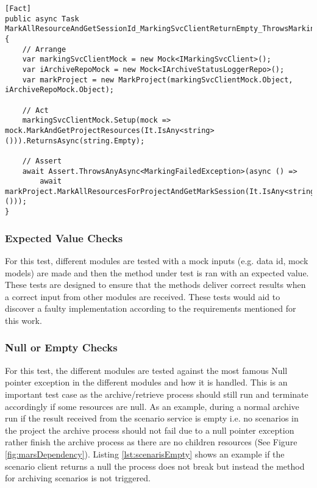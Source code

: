 \newpage
\begin{lstlisting}[language={[Sharp]C}, caption={Exception catch test example}, captionpos=b,label={lst:exceptionCatch}]
[Fact]
public async Task MarkAllResourceAndGetSessionId_MarkingSvcClientReturnEmpty_ThrowsMarkingFailedException()
{
    // Arrange
    var markingSvcClientMock = new Mock<IMarkingSvcClient>();
    var iArchiveRepoMock = new Mock<IArchiveStatusLoggerRepo>();
    var markProject = new MarkProject(markingSvcClientMock.Object, iArchiveRepoMock.Object);
    
    // Act 
    markingSvcClientMock.Setup(mock => mock.MarkAndGetProjectResources(It.IsAny<string>())).ReturnsAsync(string.Empty);
    
    // Assert
    await Assert.ThrowsAnyAsync<MarkingFailedException>(async () =>
        await markProject.MarkAllResourcesForProjectAndGetMarkSession(It.IsAny<string>()));
}
\end{lstlisting}

\subsubsection{Expected Value Checks}
For this test, different modules are tested with a mock inputs (e.g. data id, mock models) are made and then the method under test is ran with an 
expected value. These tests are designed to ensure that the methods deliver correct results when a correct input from other modules are received.
These tests would aid to discover a faulty implementation according to the requirements mentioned for this work.

\subsubsection{Null or Empty Checks}
For this test, the different modules are tested against the most famous Null pointer exception in the different modules and how it is handled. This is an important
test case as the archive/retrieve process should still run and terminate accordingly if some resources are null. As an example, during a normal archive run if the result received from
the scenario service  is empty i.e. no scenarios in the project the archive process should not fail due to a null pointer exception rather finish the archive process
as there are no children resources (See Figure \ref{fig:marsDependency}). Listing \ref{lst:scenarisEmpty} shows an example if the scenario client returns a null 
the process does not break but instead the method for archiving scenarios is not triggered. 

